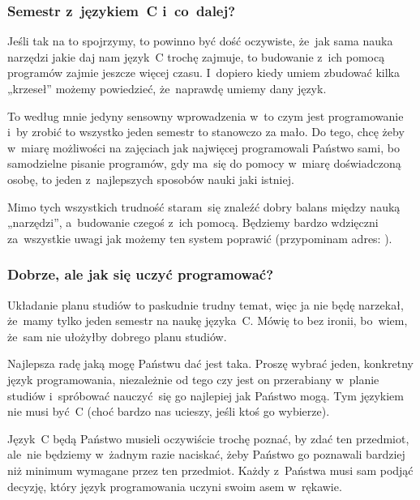 \documentclass[10pt,t]{beamer}
\begin{document}
\begin{frame}
  \frametitle{Semestr z~językiem~C i~co~dalej?}


  Jeśli tak na to spojrzymy, to powinno być dość oczywiste, że~jak sama
  nauka narzędzi jakie daj nam język~C trochę zajmuje, to budowanie z~ich
  pomocą programów zajmie jeszcze więcej czasu. I~dopiero kiedy umiem
  zbudować kilka „krzeseł” możemy powiedzieć, że~naprawdę umiemy dany język.

  To według mnie jedyny sensowny wprowadzenia w~to czym jest programowanie
  i~by zrobić to wszystko jeden semestr to stanowczo za mało. Do tego, chcę
  żeby w~miarę możliwości na zajęciach jak najwięcej programowali Państwo
  sami, bo samodzielne pisanie programów, gdy ma~się do pomocy w~miarę
  doświadczoną osobę, to jeden z~najlepszych sposobów nauki jaki istniej.

  Mimo tych wszystkich trudność staram~się znaleźć dobry balans między nauką
  „narzędzi”, a~budowanie czegoś z~ich pomocą. Będziemy bardzo wdzięczni
  za~wszystkie uwagi jak możemy ten system poprawić (przypominam adres:
  \email).

\end{frame}





\begin{frame}
  \frametitle{Dobrze, ale jak się uczyć programować?}


  Układanie planu studiów to paskudnie trudny temat, więc ja nie będę
  narzekał, że~mamy tylko jeden semestr na naukę języka~C. Mówię to bez
  ironii, bo~wiem, że~sam nie ułożyłby dobrego planu studiów.

  Najlepsza radę jaką mogę Państwu dać jest taka. Proszę wybrać jeden,
  konkretny język programowania, niezależnie od tego czy jest on przerabiany
  w~planie studiów i~spróbować nauczyć~się go najlepiej jak Państwo mogą.
  Tym językiem nie musi być~C (choć bardzo nas ucieszy, jeśli ktoś go
  wybierze).

  Język~C będą Państwo musieli oczywiście trochę poznać, by zdać ten
  przedmiot, ale~nie będziemy w~żadnym razie naciskać, żeby Państwo
  go poznawali bardziej niż minimum wymagane przez ten przedmiot. Każdy
  z~Państwa musi sam podjąć decyzję, który język programowania uczyni swoim
  asem w~rękawie.

\end{frame}
\end{document}
